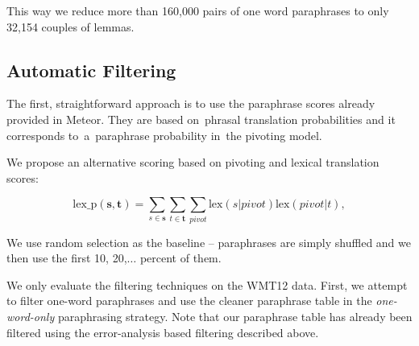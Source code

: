 This way we reduce more than 160,000 pairs of one word paraphrases to only 
32,154 couples of lemmas.

\subsection{Automatic Filtering}

The first, straightforward approach is to use the paraphrase scores already
provided in Meteor. They are based on~phrasal translation probabilities
and it corresponds to~a~paraphrase probability in~the pivoting model.

We propose an alternative scoring based on pivoting and lexical translation
scores:

$$\text{lex\_p}(\mathbf{s},\mathbf{t}) = \sum_{s \in \mathbf{s}}\sum_{t \in
\mathbf{t}}\sum_{pivot}\text{lex}(s|pivot)\text{lex}(pivot|t),$$



We use random selection as the baseline -- paraphrases are simply shuffled and 
we then use the first 10, 20,$\ldots$ percent of them.

We only evaluate the filtering techniques on the WMT12 data. First, we attempt
to filter one-word paraphrases and use the cleaner paraphrase table in the
\emph{one-word-only} paraphrasing strategy. Note that our paraphrase table has
already been filtered using the error-analysis based filtering described above.

